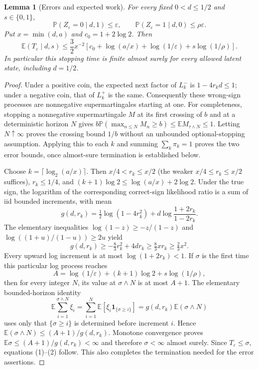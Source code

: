 \documentclass[11pt]{article}
\newtheorem{lemma}[theorem]{Lemma}
\newcommand{\E}{\mathbb E}
\newcommand{\Pp}{\mathbb P}
\newcommand{\ind}{\mathbf1}
\begin{document}
\begin{lemma}[Errors and expected work]\label{lem:classifier}
For every fixed $0<d\le1/2$ and $s\in\{0,1\}$,
\[
 \Pp(Z_\varepsilon=0\mid d,1)\le\varepsilon,
 \qquad \Pp(Z_\varepsilon=1\mid d,0)\le\rho\varepsilon.
\]
Put $x=\min(d,a)$ and $c_0=1+2\log2$. Then
\[
 \E(T_\varepsilon\mid d,s)
 \le\frac32x^{-2}\left[c_0+\log(a/x)+\log(1/\varepsilon)
                         +s\log(1/\rho)\right].           \tag{1}
\]
In particular this stopping time is finite almost surely for every allowed
latent state, including $d=1/2$.
\end{lemma}
\begin{proof}
Under a positive coin, the expected next factor of $L^-_k$ is
$1-4r_kd\le1$; under a negative coin, that of $L^+_k$ is the same.
Consequently these wrong-sign processes are nonnegative supermartingales
starting at one. For completeness, stopping a nonnegative supermartingale
$M$ at its first crossing of $b$ and at a deterministic horizon $N$ gives
$b\Pp(\max_{n\le N}M_n\ge b)\le\E M_{\tau\wedge N}\le1$.
Letting $N\uparrow\infty$ proves the crossing bound $1/b$ without an
unbounded optional-stopping assumption. Applying this to each $k$ and summing
$\sum_k\pi_k=1$ proves the two error bounds, once almost-sure termination is
established below.

Choose $k=\lceil\log_2(a/x)\rceil$. Then $x/4<r_k\le x/2$ (the weaker
$x/4\le r_k\le x/2$ suffices), $r_k\le1/4$, and
$(k+1)\log2\le\log(a/x)+2\log2$.
Under the true sign, the logarithm of the corresponding correct-sign
likelihood ratio is a sum of iid bounded increments, with mean
\[
 g(d,r_k)=\tfrac12\log(1-4r_k^2)
                +d\log\frac{1+2r_k}{1-2r_k}.
\]
The elementary inequalities
$\log(1-z)\ge-z/(1-z)$ and
$\log((1+u)/(1-u))\ge2u$ yield
\[
 g(d,r_k)\ge-\tfrac83r_k^2+4dr_k
            \ge\tfrac83xr_k\ge\tfrac23x^2.               \tag{2}
\]
Every upward log increment is at most $\log(1+2r_k)<1$.
If $\sigma$ is the first time this particular log process reaches
\[
 A=\log(1/\varepsilon)+(k+1)\log2+s\log(1/\rho),
\]
then for every integer $N$, its value at $\sigma\wedge N$ is at most $A+1$.
The elementary bounded-horizon identity
\[
 \E\sum_{i=1}^{\sigma\wedge N}\xi_i
   =\sum_{i=1}^N\E[\xi_i\ind_{\{\sigma\ge i\}}]
   =g(d,r_k)\E(\sigma\wedge N)
\]
uses only that $\{\sigma\ge i\}$ is determined before increment $i$.
Hence $\E(\sigma\wedge N)\le(A+1)/g(d,r_k)$.
Monotone convergence proves $\E\sigma\le(A+1)/g(d,r_k)<\infty$ and
therefore $\sigma<\infty$ almost surely. Since $T_\varepsilon\le\sigma$,
equations (1)--(2) follow. This also completes the termination needed for
the error assertions.
\end{proof}
\end{document}
